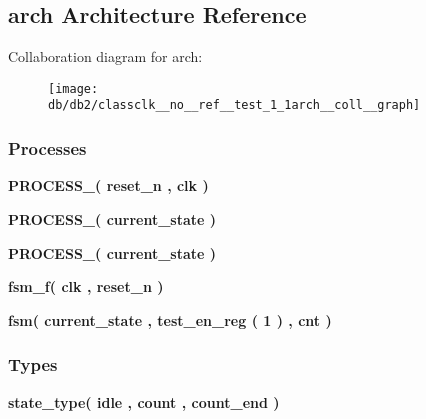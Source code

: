 \subsection{arch Architecture Reference}
\label{classclk__no__ref__test_1_1arch}


Collaboration diagram for arch\+:\nopagebreak
\begin{figure}[H]
\begin{center}
\leavevmode
\texttt{[image: db/db2/classclk\_\_no\_\_ref\_\_test\_1\_1arch\_\_coll\_\_graph]}
\end{center}
\end{figure}
\subsubsection*{Processes}
 \begin{DoxyCompactItemize}
\item 
{\bf P\+R\+O\+C\+E\+S\+S\+\_}{\bfseries  ( {\bfseries {\bfseries {\bf reset\+\_\+n}} \textcolor{vhdlchar}{ }} , {\bfseries {\bfseries {\bf clk}} \textcolor{vhdlchar}{ }} )}
\item 
{\bf P\+R\+O\+C\+E\+S\+S\+\_}{\bfseries  ( {\bfseries {\bfseries {\bf current\+\_\+state}} \textcolor{vhdlchar}{ }} )}
\item 
{\bf P\+R\+O\+C\+E\+S\+S\+\_}{\bfseries  ( {\bfseries {\bfseries {\bf current\+\_\+state}} \textcolor{vhdlchar}{ }} )}
\item 
{\bf fsm\+\_\+f}{\bfseries  ( {\bfseries {\bfseries {\bf clk}} \textcolor{vhdlchar}{ }} , {\bfseries {\bfseries {\bf reset\+\_\+n}} \textcolor{vhdlchar}{ }} )}
\item 
{\bf fsm}{\bfseries  ( {\bfseries {\bfseries {\bf current\+\_\+state}} \textcolor{vhdlchar}{ }} , {\bfseries {\bfseries {\bf test\+\_\+en\+\_\+reg}} \textcolor{vhdlchar}{(}\textcolor{vhdlchar}{ } \textcolor{vhdldigit}{1} \textcolor{vhdlchar}{)}\textcolor{vhdlchar}{ }} , {\bfseries {\bfseries {\bf cnt}} \textcolor{vhdlchar}{ }} )}
\end{DoxyCompactItemize}
\subsubsection*{Types}
 \begin{DoxyCompactItemize}
\item 
{\bfseries {\bf state\+\_\+type}{\bfseries \textcolor{vhdlchar}{(}\textcolor{vhdlchar}{ }\textcolor{vhdlchar}{idle}\textcolor{vhdlchar}{ }\textcolor{vhdlchar}{,}\textcolor{vhdlchar}{ }\textcolor{vhdlchar}{count}\textcolor{vhdlchar}{ }\textcolor{vhdlchar}{,}\textcolor{vhdlchar}{ }\textcolor{vhdlchar}{count\+\_\+end}\textcolor{vhdlchar}{ }\textcolor{vhdlchar}{)}\textcolor{vhdlchar}{ }}} 
\end{DoxyCompactItemize}
